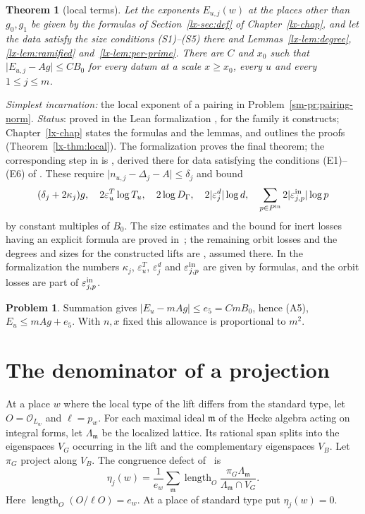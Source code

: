 \documentclass[reqno]{amsart}
\newcounter{chap}
\theoremstyle{definition}
\newtheorem{problem}{Problem}[section]
\theoremstyle{plain}
\newtheorem{theorem}{Theorem}[section]
\newcommand{\Oc}{\mathcal O}
\newcommand{\len}{\operatorname{length}}
\begin{document}
\begin{theorem}[local terms]\label{thm:local}
Let the exponents \(E_{u,j}(w)\) at the places other than \(g_0,g_1\) be given by the formulas of Section~\ref{lx-sec:def} of Chapter~\ref{lx-chap}, and let the data satisfy the size conditions (S1)--(S5) there and Lemmas~\ref{lx-lem:degree}, \ref{lx-lem:ramified} and~\ref{lx-lem:per-prime}.  There are \(C\) and \(x_0\) such that \(\lvert E_{u,j}-Ag\rvert\le CB_0\) for every datum at a scale \(x\ge x_0\), every \(u\) and every \(1\le j\le m\).
\end{theorem}
\noindent\emph{Simplest incarnation:} the local exponent of a pairing in Problem~\ref{sm-pr:pairing-norm}. \emph{Status}: proved in the Lean formalization \cite{Lean}, for the family it constructs; Chapter~\ref{lx-chap} states the formulas and the lemmas, and outlines the proofs (Theorem~\ref{lx-thm:local}).  The formalization proves the final theorem; the corresponding step in \cite{Adr} is \cite[Thm.~16.6, Cor.~16.7]{Adr}, derived there for data satisfying the conditions (E1)--(E6) of \cite[\S16.2]{Adr}.  These require \(\lvert n_{u,j}-\Delta_j-A\rvert\le\delta_j\) and bound
\[
 (\delta_j+2\kappa_j)g,\quad 2\varepsilon^T_u\log T_u,\quad 2\log D_\Gamma,\quad
 2|\varepsilon^d_j|\log d,\quad \sum_{p\in P^{\rm in}}2|\varepsilon^{\rm in}_{j,p}|\log p
\]
by constant multiples of \(B_0\).  The size estimates and the bound for inert losses having an explicit formula are proved in~\cite[Lemmas~16.10--16.12]{Adr}; the remaining orbit losses and the degrees and sizes for the constructed lifts are \cite[Hyps.~16.13--16.14]{Adr}, assumed there.  In the formalization the numbers \(\kappa_j\), \(\varepsilon^T_u\), \(\varepsilon^d_j\) and \(\varepsilon^{\rm in}_{j,p}\) are given by formulas, and the orbit losses are part of \(\varepsilon^{\rm in}_{j,p}\).

\begin{problem}\label{pr:A5}
Summation gives \(|E_u-mAg|\le e_5=CmB_0\), hence (A5), \(E_u\le mAg+e_5\).  With \(n,x\) fixed this allowance is proportional to \(m^2\).
\end{problem}

\section{The denominator of a projection}\label{sec:congruences}
At a place \(w\) where the local type of the lift differs from the standard type, let \(O=\Oc_{L_w}\) and \(\ell=p_w\).  For each maximal ideal \(\mathfrak m\) of the Hecke algebra acting on integral forms, let \(\Lambda_{\mathfrak m}\) be the localized lattice.  Its rational span splits into the eigenspaces \(V_G\) occurring in the lift and the complementary eigenspaces \(V_B\).  Let \(\pi_G\) project along \(V_B\).  The congruence defect of~\cite[Def.~17.1, Prop.~17.30]{Adr} is
\[
 \eta_j(w)=\frac1{e_w}\sum_{\mathfrak m}
 \len_O\frac{\pi_G\Lambda_{\mathfrak m}}{\Lambda_{\mathfrak m}\cap V_G}.
\]
Here \(\len_O(O/\ell O)=e_w\).  At a place of standard type put \(\eta_j(w)=0\).
\end{document}
